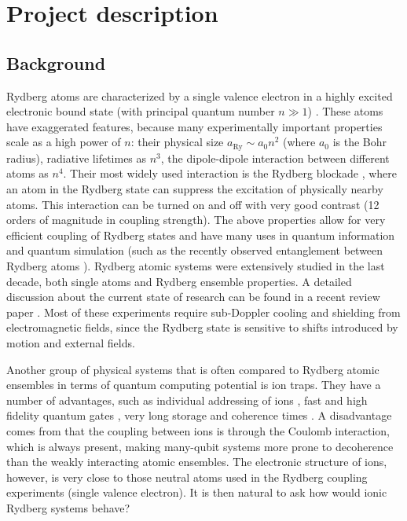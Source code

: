 \section{Project description}

\subsection{Background}

Rydberg atoms are characterized by a single valence electron in a highly excited electronic bound state (with principal quantum number $n \gg 1$) \cite{Gallagher1994}. These atoms have exaggerated features, because many experimentally important properties scale as a high power of $n$: their physical size $a_\mathrm{Ry} \sim a_0 n^2$ (where $a_0$ is the Bohr radius), radiative lifetimes as $n^3$, the dipole-dipole interaction between different atoms as $n^4$. Their most widely used interaction is the Rydberg blockade \cite{Jaksch2000}, where an atom in the Rydberg state can suppress the excitation of physically nearby atoms. This interaction can be turned on and off with very good contrast (12 orders of magnitude in coupling strength). The above properties allow for very efficient coupling of Rydberg states and have many uses in quantum information and quantum simulation (such as the recently observed entanglement between Rydberg atoms \cite{Wilk2010}). Rydberg atomic systems were extensively studied in the last decade, both single atoms and Rydberg ensemble properties. A detailed discussion about the current state of research can be found in a recent review paper \cite{Saffman2010}. Most of these experiments require sub-Doppler cooling and shielding from electromagnetic fields, since the Rydberg state is sensitive to shifts introduced by motion and external fields.

Another group of physical systems that is often compared to Rydberg atomic ensembles in terms of quantum computing potential is ion traps. They have a number of advantages, such as individual addressing of ions \cite{Nagerl1999}, fast and high fidelity quantum gates \cite{Benhelm2008}, very long storage and coherence times \cite{Lucas2007}. A disadvantage comes from that the coupling between ions is through the Coulomb interaction, which is always present, making many-qubit systems more prone to decoherence than the weakly interacting atomic ensembles. The electronic structure of ions, however, is very close to those neutral atoms used in the Rydberg coupling experiments (single valence electron). It is then natural to ask how would ionic Rydberg systems behave?

